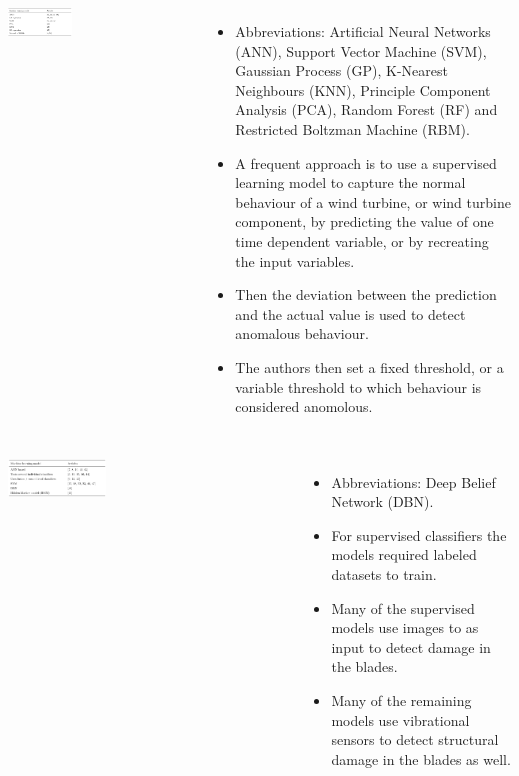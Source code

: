 \documentclass[18pt, a3paper, portrait]{tikzposter}
\begin{document}
\begin{columns}
    {
        \begin{tikzfigure}
            \includegraphics[width=0.35\textwidth]{images/regression_based_models_table.png}
        \end{tikzfigure}
    }
 
    {
        \begin{itemize}
            \item Abbreviations: Artificial Neural Networks (ANN), Support Vector Machine (SVM), Gaussian Process (GP), K-Nearest Neighbours (KNN), Principle Component Analysis (PCA), Random Forest (RF) and Restricted Boltzman Machine (RBM).
            \item A frequent approach is to use a supervised learning model to capture the normal behaviour
                of a wind turbine, or wind turbine component, by predicting the value of one time dependent
                variable, or by recreating the input variables.
            \item Then the deviation between the prediction and
                the actual value is used to detect anomalous behaviour.
            \item The authors then set a fixed threshold, or a variable threshold to which behaviour is considered anomolous.
        \end{itemize}
    }
\end{columns}

\begin{columns}
    {
        \begin{tikzfigure}
            \includegraphics[width=0.35\textwidth]{images/supervised_clas_based_models_table.png}
        \end{tikzfigure}
    }
 
    {
        \begin{itemize}
            \item Abbreviations: Deep Belief Network (DBN).
            \item For supervised classifiers the models required labeled datasets to train. 
            \item Many of the supervised models use images to as input to detect damage in the blades.
            \item Many of the remaining models use vibrational sensors to detect structural damage in the blades as well.
        \end{itemize}
    }
\end{columns}
\end{document}
